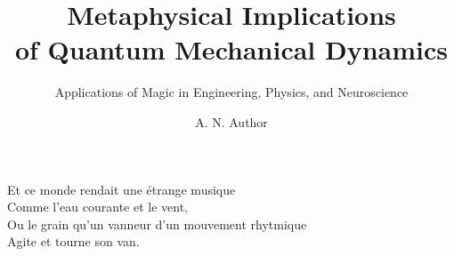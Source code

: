 \documentclass[oldfontcommands,6x9]{pupbook}
\begin{document}
\frontmatter	
\title{Metaphysical Implications\\ of Quantum Mechanical Dynamics}


\subtitle{Applications of Magic in Engineering, Physics, and Neuroscience}

\author{A. N. Author}

\makehalftitle

\makepuptitle


\begin{bookepigraph}
Et ce monde rendait une \'{e}trange musique\\
Comme l'eau courante et le vent,\\
Ou le grain qu'un vanneur d'un mouvement rhytmique\\
Agite et tourne son van.
\end{bookepigraph}



\tableofcontents
\end{document}
